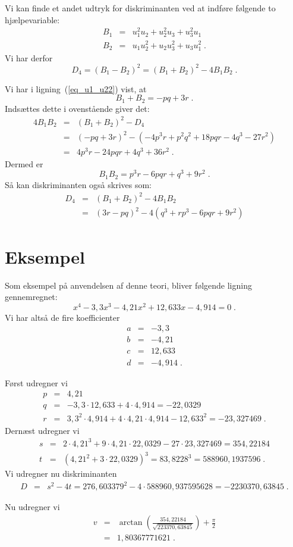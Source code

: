 \documentclass[12pt,oneside,a4paper]{article}
\newcommand{\bas}{\begin{eqnarray*}}
\newcommand{\eas}{\end{eqnarray*}}
\begin{document}
Vi kan finde et andet udtryk for diskriminanten ved
at indføre følgende to hjælpevariable:
\bas
B_1 &=& u_1^2u_2 + u_2^2u_3 + u_3^2u_1 \\
B_2 &=& u_1u_2^2 + u_2u_3^2 + u_3u_1^2 \;.
\eas
Vi har derfor
\begin{equation}
D_4 = (B_1-B_2)^2 = (B_1+B_2)^2 - 4B_1B_2\;.
\end{equation}

Vi har i ligning~(\ref{eq_u1_u22}) vist, at
\[
B_1 + B_2 = -pq + 3r\;.
\]
Indsættes dette i ovenstående giver det:
\bas
4B_1B_2 &=& (B_1+B_2)^2 - D_4 \\
&=& (-pq+3r)^2 - (-4p^3r + p^2q^2 + 18pqr - 4q^3 - 27r^2) \\
&=& 4p^3r - 24pqr + 4q^3 + 36r^2 \;.
\eas
Dermed er
\begin{equation}
B_1B_2 = p^3r - 6pqr + q^3 + 9r^2\;.
\end{equation}
Så kan diskriminanten også skrives som:
\bas
D_4 &=& (B_1+B_2)^2 - 4B_1B_2 \\
&=& (3r-pq)^2 - 4(q^3 + rp^3 - 6pqr + 9r^2) 
\eas


\section{Eksempel}
Som eksempel på anvendelsen af denne teori, bliver følgende
ligning gennemregnet:
\begin{equation}
    x^4 - 3,3 x^3 - 4,21 x^2 + 12,633 x - 4,914 = 0 \;.
\end{equation}
Vi har altså de fire koefficienter
\bas
a &=& -3,3 \\
b &=& -4,21 \\
c &=& 12,633 \\
d &=& -4,914 \;.
\eas

Først udregner vi
\bas
p &=& 4,21 \\
q &=& -3,3\cdot 12,633 + 4\cdot 4,914 = -22,0329 \\
r &=& 3,3^2\cdot 4,914 + 4\cdot 4,21 \cdot 4,914 - 12,633^2 = -23,327469 \;.
\eas
Dernæst udregner vi
\bas
s &=& 2\cdot 4,21^3 + 9\cdot 4,21 \cdot 22,0329 - 27\cdot 23,327469
    = 354,22184\\
t &=&  (4,21^2 + 3\cdot 22,0329)^3 = 83,8228^3
    = 588960,1937596 \;.
\eas
Vi udregner nu diskriminanten 
\bas
D &=& s^2-4t = 276,603379^2 - 4\cdot 588960,937595628 = -2230370,63845 \;.
\eas

Nu udregner vi
\bas
v &=& \arctan\left(\frac{354,22184}{\sqrt{223370,63845}}\right) + \frac{\pi}{2} \\
&=& 1,80367771621 \;.
\eas
\end{document}
